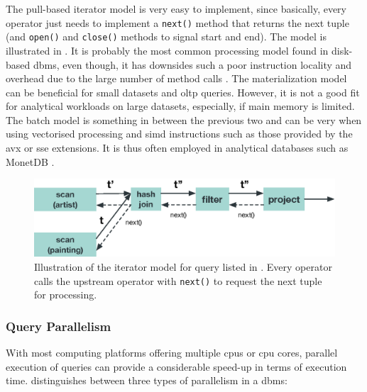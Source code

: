 The pull-based iterator model is very easy to implement, since basically, every operator just needs to implement a \texttt{next()} method that returns the next tuple (and \texttt{open()} and \texttt{close()} methods to signal start and end). The model is illustrated in . It is probably the most common processing model found in disk-based \acrshort{dbms}, even though, it has downsides such a poor instruction locality and overhead due to the large number of method calls \cite{Neumann:2014Compiling}. The materialization model can be beneficial for small datasets and \acrshort{oltp} queries. However, it is not a good fit for analytical workloads on large datasets, especially, if main memory is limited. The batch model is something in between the previous two and can be very when using vectorised processing and \acrshort{simd} instructions such as those provided by the \acrshort{avx} or \acrshort{sse} extensions. It is thus often employed in analytical databases such as MonetDB \cite{Idreos:2012MonetDB}.

\begin{figure}[tb]
    \centering
    \includegraphics[width=\textwidth]{figures/iterator-model.eps}
    \caption{Illustration of the iterator model for query listed in . Every operator calls the upstream operator with \texttt{next()} to request the next tuple for processing.}
    \label{figure:iterator_model}
\end{figure}

\subsubsection{Query Parallelism}

With most computing platforms offering multiple \acrshort{cpu}s or \acrshort{cpu} cores, parallel execution of queries can provide a considerable speed-up in terms of execution time. \cite{Graefe:1993Query} distinguishes between three types of parallelism in a \acrshort{dbms}:

